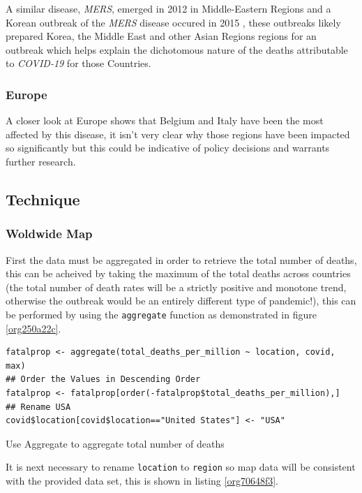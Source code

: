 \documentclass[11pt]{article}
\begin{document}
A similar disease, \emph{MERS}, emerged in 2012 in Middle-Eastern Regions
\cite{woodley2020} and a Korean outbreak of the \emph{MERS} disease occured in 2015
\cite{serrano2015}, these outbreaks likely prepared Korea, the Middle East and
other Asian Regions regions for an outbreak which helps explain the dichotomous
nature of the deaths attributable to \emph{COVID-19} for those Countries.

\subsubsection{Europe}
\label{sec:orge18402f}
A closer look at Europe shows that Belgium and Italy have been the most affected
by this disease, it isn't very clear why those regions have been impacted so
significantly but this could be indicative of policy decisions and warrants
further research.

\subsection{Technique}
\label{sec:org7a533fc}
\subsubsection{Woldwide Map}
\label{sec:org9ad7bb1}
First the data must be aggregated in order to retrieve the total number of
deaths, this can be acheived by taking the maximum of the total deaths across
countries (the total number of death rates will be a strictly positive and
monotone trend, otherwise the outbreak would be an entirely different type of
pandemic!), this can be performed by using the \texttt{aggregate} function as
demonstrated in figure \ref{org250a22c}.

\begin{listing}[htbp]
\begin{verbatim}
fatalprop <- aggregate(total_deaths_per_million ~ location, covid, max)
## Order the Values in Descending Order
fatalprop <- fatalprop[order(-fatalprop$total_deaths_per_million),]
## Rename USA
covid$location[covid$location=="United States"] <- "USA"
\end{verbatim}
\caption{\label{org250a22c}Use Aggregate to aggregate total number of deaths}
\end{listing}


It is next necessary to rename \texttt{location} to \texttt{region} so map data will be
consistent with the provided data set, this is shown in listing \ref{org70648f3}.
\end{document}
